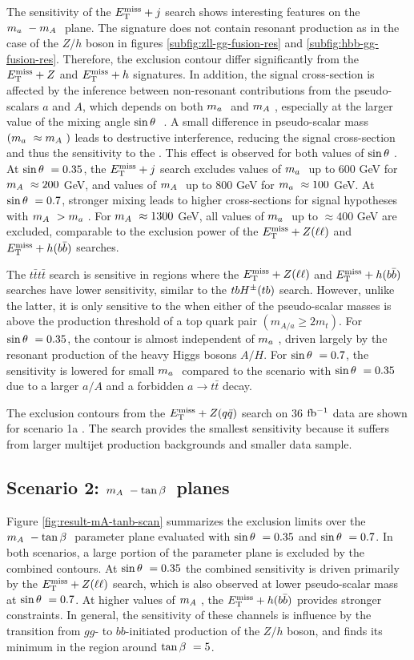 The sensitivity of the $E_{\mathrm{T}}^{\mathrm{miss}}+j$ search shows interesting features on the $m_a~-m_A~$ plane. The signature does not contain resonant production as in the case of the $Z/h$ boson in figures \ref{subfig:zll-gg-fusion-res} and \ref{subfig:hbb-gg-fusion-res}. Therefore, the exclusion contour differ significantly from the $E_{\mathrm{T}}^{\mathrm{miss}}+Z$ and $E_{\mathrm{T}}^{\mathrm{miss}}+h$ signatures. In addition, the signal cross-section is affected by the inference between non-resonant contributions from the pseudo-scalars $a$ and $A$, which depends on both $m_a~$ and $m_A~$, especially at the larger value of the mixing angle $\sin\theta~$ \cite{Bauer:2017ota}. A small difference in pseudo-scalar mass $(m_a~\approx m_A~)$ leads to destructive interference, reducing the signal cross-section and thus the sensitivity to the \hdma. This effect is observed for both values of $\sin\theta~$. At $\sin\theta~=0.35$, the $E_{\mathrm{T}}^{\mathrm{miss}}+j$ search excludes values of $m_a~$ up to 600 GeV for $m_A~\approx 200$ GeV, and values of $m_A~$ up to 800 GeV for $m_a~\approx 100 $ GeV. At $\sin\theta~=0.7$, stronger mixing leads to higher cross-sections for signal hypotheses with $m_A~>m_a~$. For $m_A~\approx 1300$ GeV, all values of $m_a~$ up to $\approx 400$ GeV are excluded, comparable to the exclusion power of the $E_{\mathrm{T}}^{\mathrm{miss}}+Z(\ell\ell)$ and $E_{\mathrm{T}}^{\mathrm{miss}}+h(b\bar{b})$ searches. 

The $t\bar{t}t\bar{t}$ search is sensitive in regions where the $E_{\mathrm{T}}^{\mathrm{miss}}+Z(\ell\ell)$ and $E_{\mathrm{T}}^{\mathrm{miss}}+h(b\bar{b})$ searches have lower sensitivity, similar to the $tbH^{\pm}(tb)$ search. However, unlike the latter, it is only sensitive to the \thdma when either of the pseudo-scalar masses is above the production threshold of a top quark pair $(m_{A/a}\ge 2m_t)$. For $\sin\theta~ = 0.35$, the contour is almost independent of $m_a~$, driven largely by the resonant production of the heavy Higgs bosons $A/H$. For $\sin\theta~ = 0.7$, the sensitivity is lowered for small $m_a~$ compared to the scenario with $\sin\theta~=0.35$ due to a larger $a/A$ and a forbidden $a\rightarrow t\bar{t}$ decay.

The exclusion contours from the $E_{\mathrm{T}}^{\mathrm{miss}} + Z(q\bar{q})$ search on 36 $\mbox{fb\(^{-1}\)}$ data are shown for scenario 1a \cite{EXOT-2017-32}. The search provides the smallest sensitivity because it suffers from larger multijet production backgrounds and smaller data sample.

\subsection{Scenario 2: \texorpdfstring{$m_A~-\tan\beta~$}{TEXT} planes}

Figure \ref{fig:result-mA-tanb-scan} summarizes the exclusion limits over the $m_A~-\tan\beta~$ parameter plane evaluated with $\sin\theta~ = 0.35$ and $\sin\theta~ = 0.7$. In both scenarios, a large portion of the parameter plane is excluded by the combined contours. At $\sin\theta~=0.35$ the combined sensitivity is driven primarily by the $E_{\mathrm{T}}^{\mathrm{miss}}+Z(\ell\ell)$ search, which is also observed at lower pseudo-scalar mass at $\sin\theta~=0.7$. At higher values of $m_A~$, the $E_{\mathrm{T}}^{\mathrm{miss}}+h(b\bar{b})$ provides stronger constraints. In general, the sensitivity of these channels is influence by the transition from $gg$- to $bb$-initiated production of the $Z/h$ boson, and finds its minimum in the region around $\tan\beta~=5$. 

